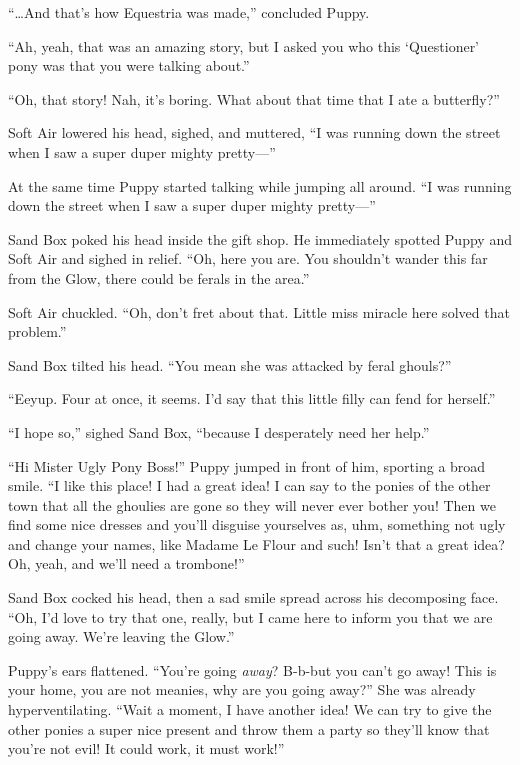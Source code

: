 
``\dots And that's how Equestria was made,'' concluded Puppy.

``Ah, yeah, that was an amazing story, but I asked you who this `Questioner' pony was that you were talking about.''

``Oh, that story! Nah, it's boring. What about that time that I ate a butterfly?''

Soft Air lowered his head, sighed, and muttered, ``I was running down the street when I saw a super duper mighty pretty---''

At the same time Puppy started talking while jumping all around. ``I was running down the street when I saw a super duper mighty pretty---''


\horizonline


Sand Box poked his head inside the gift shop. He immediately spotted Puppy and Soft Air and sighed in relief. ``Oh, here you are. You shouldn't wander this far from the Glow, there could be ferals in the area.''

Soft Air chuckled. ``Oh, don't fret about that. Little miss miracle here solved that problem.''

Sand Box tilted his head. ``You mean she was attacked by feral ghouls?''

``Eeyup. Four at once, it seems. I'd say that this little filly can fend for herself.''

``I hope so,'' sighed Sand Box, ``because I desperately need her help.''

``Hi Mister Ugly Pony Boss!'' Puppy jumped in front of him, sporting a broad smile. ``I like this place! I had a great idea! I can say to the ponies of the other town that all the ghoulies are gone so they will never ever bother you! Then we find some nice dresses and you'll disguise yourselves as, uhm, something not ugly and change your names, like Madame Le Flour and such! Isn't that a great idea? Oh, yeah, and we'll need a trombone!''

Sand Box cocked his head, then a sad smile spread across his decomposing face. ``Oh, I'd love to try that one, really, but I came here to inform you that we are going away. We're leaving the Glow.''

Puppy's ears flattened. ``You're going \emph{away}\/? B-b-but you can't go away! This is your home, you are not meanies, why are you going away?'' She was already hyperventilating. ``Wait a moment, I have another idea! We can try to give the other ponies a super nice present and throw them a party so they'll know that you're not evil! It could work, it must work!''

